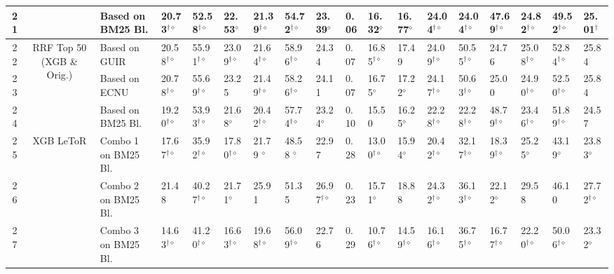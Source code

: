 \begin{table*}
{\begin{tabular}{ccllllllllllllllll}
21  &  & Based on BM25 Bl.  & 20.73$^{\dagger\diamond}$ & 52.58$^{\dagger\diamond}$ & 22.53$^{\diamond}$  & 21.39$^{\dagger\diamond}$ & 54.72$^{\dagger\diamond}$ & 23.39$^{\diamond}$  & 0.06 & 16.32$^{\diamond}$  & 16.77$^{\diamond}$ & 24.04$^{\dagger\diamond}$ & 24.04$^{\dagger\diamond}$ & 47.69$^{\dagger\diamond}$ & 24.82$^{\dagger\diamond}$ & 49.52$^{\dagger\diamond}$ & 25.01$^{\dagger}$ \tabularnewline
\midrule 
22 & \multirow{3}{*}{RRF Top 50 (XGB \& Orig.)} & Based on GUIR  & 20.58$^{\dagger\diamond}$ & 55.91$^{\dagger\diamond}$ & 23.09$^{\dagger\diamond}$ & 21.64$^{\dagger\diamond}$ & 58.96$^{\dagger\diamond}$ & 24.34 & 0.07 & 16.85$^{\dagger\diamond}$ & 17.49 & 24.09$^{\dagger\diamond}$ & 50.55$^{\dagger\diamond}$ & 24.76 & 25.08$^{\dagger\diamond}$ & 52.84$^{\dagger\diamond}$ & 25.84\tabularnewline
23  &  & Based on ECNU  & 20.78$^{\dagger\diamond}$ & 55.69$^{\dagger\diamond}$ & 23.25  & 21.49$^{\dagger\diamond}$ & 58.26$^{\dagger\diamond}$ & 24.11 & 0.07 & 16.75$^{\diamond}$  & 17.22$^{\diamond}$ & 24.17$^{\dagger\diamond}$ & 50.63$^{\dagger\diamond}$ & 25.00 & 24.90$^{\dagger\diamond}$ & 52.50$^{\dagger\diamond}$ & 25.84 \tabularnewline
24  &  & Based on BM25 Bl.  & 19.20$^{\dagger\diamond}$ & 53.93$^{\dagger\diamond}$ & 21.68$^{\diamond}$  & 20.42$^{\dagger\diamond}$ & 57.74$^{\dagger\diamond}$ & 23.24$^{\diamond}$ & 0.10 & 15.50  & 16.25$^{\diamond}$ & 22.28$^{\dagger\diamond}$ & 22.28$^{\dagger\diamond}$ & 48.79$^{\dagger\diamond}$ & 23.46$^{\dagger\diamond}$ & 51.89$^{\dagger\diamond}$ & 24.57\tabularnewline
\midrule 
25 & \multirow{5}{*}{XGB LeToR} & Combo 1 on BM25 Bl.  & 17.67$^{\dagger\diamond}$ & 35.92$^{\dagger\diamond}$ & 17.80$^{\dagger\diamond}$ & 21.79 $^{\diamond}$  & 48.58 $^{\diamond}$  & 22.97  & 0.28 & 13.00$^{\dagger\diamond}$ & 15.94$^{\diamond}$  & 20.42$^{\dagger\diamond}$ & 32.17$^{\dagger\diamond}$ & 18.39$^{\dagger\diamond}$ & 25.25$^{\diamond}$ & 43.19$^{\diamond}$  & 23.83$^{\diamond}$\tabularnewline
26  &  & Combo 2 on  BM25 Bl. & 21.48  & 40.27$^{\dagger\diamond}$ & 21.71$^{\diamond}$  & 25.91  & 51.35  & 26.97$^{\dagger\diamond}$ & 0.23 & 15.71$^{\diamond}$  & 18.88  & 24.32$^{\dagger\diamond}$ & 36.13$^{\dagger\diamond}$ & 22.12$^{\diamond}$  & 29.58  & 46.10  & 27.72$^{\dagger\diamond}$\tabularnewline
27 &  & Combo 3 on BM25 Bl. & 14.63$^{\dagger\diamond}$ & 41.20$^{\dagger\diamond}$ & 16.63$^{\dagger\diamond}$ & 19.68$^{\dagger\diamond}$ & 56.09$^{\dagger\diamond}$ & 22.76  & 0.29 & 10.76$^{\dagger\diamond}$ & 14.59$^{\dagger\diamond}$ & 16.16$^{\dagger\diamond}$ & 36.75$^{\dagger\diamond}$ & 16.77$^{\dagger\diamond}$ & 22.20$^{\dagger\diamond}$ & 50.06$^{\dagger\diamond}$ & 23.32$^{\diamond}$\tabularnewline

\end{tabular}}
\end{table*}
